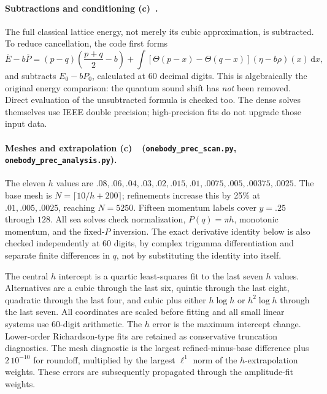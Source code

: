 \documentclass[11pt,a4paper]{article}
\newcommand{\Lc}{\textbf{(c)}\ }
\newcommand{\dd}{\mathrm d}
\newcommand{\scan}{\texttt{onebody\_\allowbreak prec\_\allowbreak scan.py}}
\newcommand{\ana}{\texttt{onebody\_\allowbreak prec\_\allowbreak analysis.py}}
\begin{document}
\paragraph{Subtractions and conditioning \Lc.}
The full classical lattice energy, not merely its cubic approximation,
is subtracted. To reduce cancellation, the code first forms
\begin{equation}
 \overline E-b\overline P
 =(p-q)\left(\frac{p+q}{2}-b\right)
 +\int[\Theta(p-x)-\Theta(q-x)](\eta-b\rho)(x)\,\dd x,
 \label{eq:stable}
\end{equation}
and subtracts $E_0-bP_0$, calculated at 60 decimal digits.
This is algebraically the original energy comparison: the quantum sound
shift has \emph{not} been removed. Direct evaluation of the unsubtracted
formula is checked too. The dense solves themselves use IEEE double
precision; high-precision fits do not upgrade those input data.

\paragraph{Meshes and extrapolation \Lc\ (\scan, \ana).}
The eleven $h$ values are
$.08,.06,.04,.03,.02,.015,.01,.0075,.005,.00375,.0025$.
The base mesh is $N=\lceil10/h+200\rceil$; refinements increase this by
25\% at $.01,.005,.0025$, reaching $N=5250$.
Fifteen momentum labels cover $y=.25$ through $128$.
All sea solves check normalization, $P(q)=\pi h$, monotonic momentum,
and the fixed-$P$ inversion. The exact derivative identity below is also
checked independently at 60 digits, by complex trigamma differentiation and
separate finite differences in $q$, not by substituting the identity into itself.

The central $h$ intercept is a quartic least-squares fit to the last seven
$h$ values. Alternatives are a cubic through the last six, quintic through
the last eight, quadratic through the last four, and cubic plus either
$h\log h$ or $h^2\log h$ through the last seven. All coordinates are scaled
before fitting and all small linear systems use 60-digit arithmetic.
The $h$ error is the maximum intercept change. Lower-order Richardson-type
fits are retained as conservative truncation diagnostics.
The mesh diagnostic is the largest refined-minus-base difference plus
$2\,10^{-10}$ for roundoff, multiplied by the largest $\ell^1$ norm of the
$h$-extrapolation weights. These errors are subsequently propagated through
the amplitude-fit weights.
\end{document}
